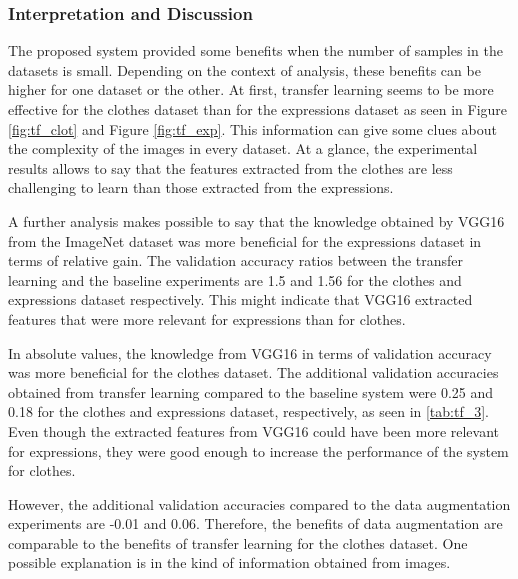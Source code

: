 \documentclass{article}
\begin{document}
\subsubsection{\textbf{Interpretation and Discussion}}

The proposed system provided some benefits when the number of samples in the datasets is small. Depending on the context of analysis, these benefits can be higher for one dataset or the other. At first, transfer learning seems to be more effective for the clothes dataset than for the expressions dataset as seen in Figure \ref{fig:tf_clot} and Figure \ref{fig:tf_exp}. This information can give some clues about the complexity of the images in every dataset. At a glance, the experimental results allows to say that the features extracted from the clothes are less challenging to learn than those extracted from the expressions.


\addtocounter{footnote}{-2}
\addtocounter{footnote}{1}
\addtocounter{footnote}{1}


A further analysis makes possible to say that the knowledge obtained by VGG16 from the ImageNet dataset was more beneficial for the expressions dataset in terms of relative gain. The validation accuracy ratios between the transfer learning and the baseline experiments are 1.5 and 1.56 for the clothes and expressions dataset respectively. This might indicate that VGG16 extracted features that were more relevant for expressions than for clothes.

In absolute values, the knowledge from VGG16 in terms of validation accuracy was more beneficial for the clothes dataset. The additional validation accuracies obtained from transfer learning compared to the baseline system were 0.25 and 0.18 for the clothes and expressions dataset, respectively, as seen in \ref{tab:tf_3}. Even though the extracted features from VGG16 could have been more relevant for expressions, they were good enough to increase the performance of the system for clothes.

However, the additional validation accuracies compared to the data augmentation experiments are -0.01 and 0.06. Therefore, the benefits of data augmentation are comparable to the benefits of transfer learning for the clothes dataset. One possible explanation is in the kind of information obtained from images. 
\end{document}
